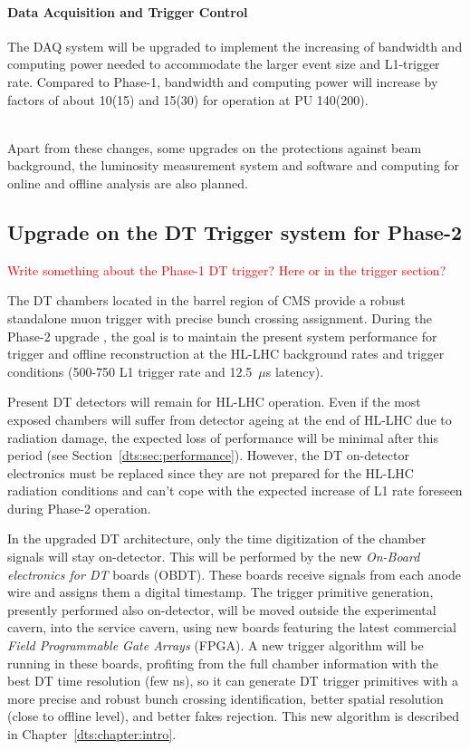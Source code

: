 \documentclass[../main.tex]{subfiles}
\begin{document}
\paragraph{Data Acquisition and Trigger Control}

The DAQ system will be upgraded to implement the increasing of bandwidth and computing power needed to accommodate the larger event size and L1-trigger rate. Compared to Phase-1, bandwidth and computing power will increase by factors of about 10(15) and 15(30) for operation at PU 140(200).

~\\Apart from these changes, some upgrades on the protections against beam background, the luminosity measurement system and software and computing for online and offline analysis are also planned. 


\subsection{Upgrade on the DT Trigger system for Phase-2}

\textcolor{red}{Write something about the Phase-1 DT trigger? Here or in the trigger section?}

The DT chambers located in the barrel region of CMS provide a robust standalone muon trigger with precise bunch crossing assignment. During the Phase-2 upgrade \cite{muontdr, l1tdr}, the goal is to maintain the present system performance for trigger and offline reconstruction at the HL-LHC background rates and trigger conditions (500-750 L1 trigger rate and 12.5~$\mu$s latency).

Present DT detectors will remain for HL-LHC operation. Even if the most exposed chambers will suffer from detector ageing at the end of HL-LHC due to radiation damage, the expected loss of performance will be minimal after this period (see Section~\ref{dts:sec:performance}). However, the DT on-detector electronics must be replaced since they are not prepared for the HL-LHC radiation conditions and can't cope with the expected increase of L1 rate foreseen during Phase-2 operation.

In the upgraded DT architecture, only the time digitization of the chamber signals will stay on-detector. This will be performed by the new \textit{On-Board electronics for DT} boards (OBDT). These boards receive signals from each anode wire and assigns them a digital timestamp. The trigger primitive generation, presently performed also on-detector, will be moved outside the experimental cavern, into the service cavern, using new boards featuring the latest commercial \textit{Field Programmable Gate Arrays} (FPGA). A new trigger algorithm will be running in these boards, profiting from the full chamber information with the best DT time resolution (few ns), so it can generate DT trigger primitives with a more precise and robust bunch crossing identification, better spatial resolution (close to offline level), and better fakes rejection. This new algorithm is described in Chapter~\ref{dts:chapter:intro}.




%
%
\end{document}
